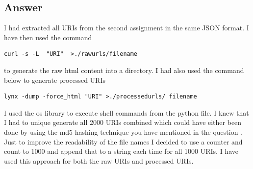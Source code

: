 \documentclass[letterpaper,11pt]{article}
\begin{document}
\subsection*{Answer}

I had extracted all URIs from the second assignment in the same JSON format. I have then used the command
\begin{lstlisting}[frame=single]
curl -s -L  "URI"  >./rawurls/filename
\end{lstlisting}

to generate the raw html content into a directory.
I had also used the command below to generate processed URIs
\begin{lstlisting}[frame=single]
lynx -dump -force_html "URI" >./processedurls/ filename
\end{lstlisting}

I used the os library to execute shell commands from the python file.
I knew that I had to unique generate all 2000 URIs combined which could have either been done by using the md5 hashing technique you have mentioned in the question .
Just to improve the readability of the file names I decided to use a counter and count to 1000 and append that to a string each time for all 1000 URIs. I have used this approach for both the raw URIs and processed URIs.  
\end{document}
